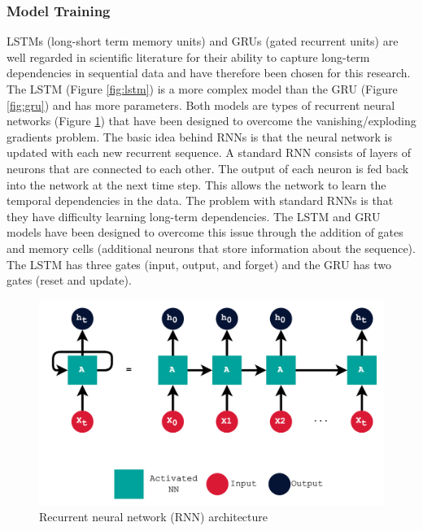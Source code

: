 \subsubsection{Model Training}

LSTMs (long-short term memory units) and GRUs (gated recurrent units) are well regarded in scientific literature for their ability to capture long-term dependencies in sequential data and have therefore been chosen for this research. The LSTM (Figure \ref{fig:lstm}) is a more complex model than the GRU (Figure \ref{fig:gru}) and has more parameters. Both models are types of recurrent neural networks (Figure \ref{fig:rnn}) that have been designed to overcome the vanishing/exploding gradients problem. The basic idea behind RNNs is that the neural network is updated with each new recurrent sequence. A standard RNN consists of layers of neurons that are connected to each other. The output of each neuron is fed back into the network at the next time step. This allows the network to learn the temporal dependencies in the data. The problem with standard RNNs is that they have difficulty learning long-term dependencies. The LSTM and GRU models have been designed to overcome this issue through the addition of gates and memory cells (additional neurons that store information about the sequence). The LSTM has three gates (input, output, and forget) and the GRU has two gates (reset and update).

\begin{figure}[H]
    \centering
    \includegraphics[scale=0.15]{figures/methodology/rnn.png}
    \caption{Recurrent neural network (RNN) architecture}
    \label{fig:rnn}
\end{figure}

